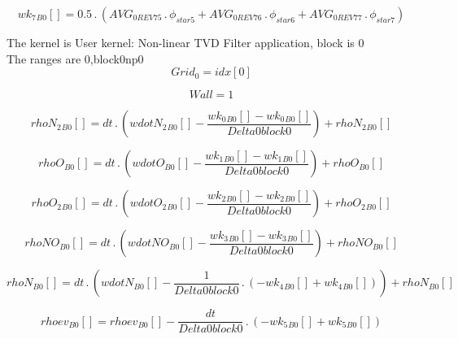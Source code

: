 \documentclass{article}
\begin{document}
\begin{dmath}{wk_{7}{_{B0}}}[{}] = 0.5 \,.\, \left(AVG_{0 REV 75} \,.\, \phi_{star 5} + AVG_{0 REV 76} \,.\, \phi_{star 6} + AVG_{0 REV 77} \,.\, \phi_{star 7}\right)\end{dmath}

\noindent The kernel is User kernel: Non-linear TVD Filter application, block is 0\\\noindent The ranges are 0,block0np0\\\begin{dmath}Grid_{0} = {idx}[{0}]\end{dmath}

\begin{dmath}Wall = 1\end{dmath}

\begin{dmath}{rhoN_{2}{_{B0}}}[{}] = dt \,.\, \left({wdotN_{2}{_{B0}}}[{}] - \frac{{wk_{0}{_{B0}}}[{}] - {wk_{0}{_{B0}}}[{}]}{Delta0block0}\right) + {rhoN_{2}{_{B0}}}[{}]\end{dmath}

\begin{dmath}{rhoO{_{B0}}}[{}] = dt \,.\, \left({wdotO{_{B0}}}[{}] - \frac{{wk_{1}{_{B0}}}[{}] - {wk_{1}{_{B0}}}[{}]}{Delta0block0}\right) + {rhoO{_{B0}}}[{}]\end{dmath}

\begin{dmath}{rhoO_{2}{_{B0}}}[{}] = dt \,.\, \left({wdotO_{2}{_{B0}}}[{}] - \frac{{wk_{2}{_{B0}}}[{}] - {wk_{2}{_{B0}}}[{}]}{Delta0block0}\right) + {rhoO_{2}{_{B0}}}[{}]\end{dmath}

\begin{dmath}{rhoNO{_{B0}}}[{}] = dt \,.\, \left({wdotNO{_{B0}}}[{}] - \frac{{wk_{3}{_{B0}}}[{}] - {wk_{3}{_{B0}}}[{}]}{Delta0block0}\right) + {rhoNO{_{B0}}}[{}]\end{dmath}

\begin{dmath}{rhoN{_{B0}}}[{}] = dt \,.\, \left({wdotN{_{B0}}}[{}] - \frac{1}{Delta0block0} \,.\, \left(- {wk_{4}{_{B0}}}[{}] + {wk_{4}{_{B0}}}[{}]\right)\right) + {rhoN{_{B0}}}[{}]\end{dmath}

\begin{dmath}{rhoev{_{B0}}}[{}] = {rhoev{_{B0}}}[{}] - \frac{dt}{Delta0block0} \,.\, \left(- {wk_{5}{_{B0}}}[{}] + {wk_{5}{_{B0}}}[{}]\right)\end{dmath}
\end{document}
